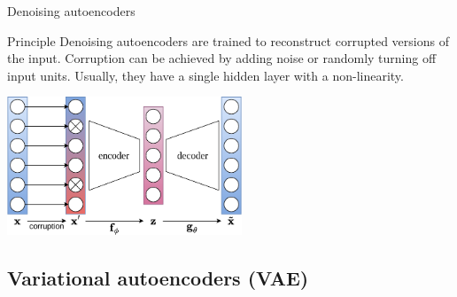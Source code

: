 \documentclass{beamer}
\begin{document}
  \begin{frame}{Denoising autoencoders}


    \begin{block}{Principle}
      Denoising autoencoders \cite{Vincent2010} are trained to reconstruct \alert{corrupted} versions of the input. Corruption can be achieved by adding noise or randomly turning off input units. Usually, they have a single hidden layer with a non-linearity.
    \end{block}

    \centering
    \includegraphics[width=7cm]{rc/denoising-autoencoder}
    
  \end{frame}

  \subsection{Variational autoencoders (VAE)}
\end{document}
